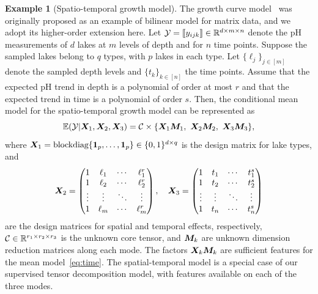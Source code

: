 \documentclass[10pt]{article}
\theoremstyle{definition}
\theoremstyle{definition}
\newtheorem{example}{Example}
\theoremstyle{definition}
\begin{document}
\begin{example}[Spatio-temporal growth model]
The growth curve model~\cite{gabriel1998generalised,srivastava2008models} was originally proposed as an example of bilinear model for matrix data, and we adopt its higher-order extension here. Let $\mathcal{Y}=\llbracket y_{ijk} \rrbracket\in\mathbb{R}^{d \times m\times n}$ denote the pH measurements of $d$ lakes at $m$ levels of depth and for $n$ time points. Suppose the sampled lakes belong to $q$ types, with $p$ lakes in each type. Let $\{\ell_j\}_{j\in[m]}$ denote the sampled depth levels and $\{t_k\}_{k\in[n]}$ the time points. Assume that the expected pH trend in depth is a polynomial of order at most $r$ and that the expected trend in time is a polynomial of order $s$. Then, the conditional mean model for the spatio-temporal growth model can be represented as
\begin{equation}\label{eq:time}
\mathbb{E}(\tY|\mX_1,\mX_2,\mX_3)=\tC\times\{\mX_1\mM_1,\ \mX_2\mM_2,\ \mX_3\mM_3\},
\end{equation}
where $\bm X_1=\text{blockdiag}\{\mathbf{1}_p,\ldots,\mathbf{1}_p\}\in \{0,1\}^{d\times q}$ is the design matrix for lake types, and
\[
\bm X_2=
\begin{pmatrix}
1 & \ell_1&\cdots &\ell^{r}_1\\
1 & \ell_2&\cdots &\ell^{r}_2\\
\vdots &\vdots&\ddots&\vdots\\
1&\ell_{m}&\cdots&\ell^{r}_{m}
\end{pmatrix},\quad
\bm X_3=
\begin{pmatrix}
1 & t_1&\cdots &t^{s}_1\\
1 & t_2&\cdots &t^{s}_2\\
\vdots &\vdots&\ddots&\vdots\\
1&t_{n}&\cdots&t^{s}_{n}
\end{pmatrix}
\]
are the design matrices for spatial and temporal effects, respectively, $\mathcal{C}\in\mathbb{R}^{r_1\times r_2\times r_3}$ is the unknown core tensor, and $\bm M_k$ are unknown dimension reduction matrices along each mode. The factors $\bm X_k\bm M_k$ are sufficient features for the mean model~\eqref{eq:time}. The spatial-temporal model is a special case of our supervised tensor decomposition model, with features available on each of the three modes.\\
\end{example}
\end{document}
